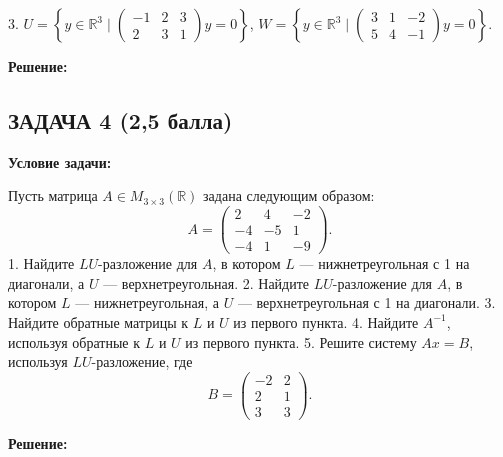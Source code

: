 \documentclass[a4paper,12pt]{article}
\begin{document}
3. \( U = \left\{ y \in \mathbb{R}^3 \mid
\begin{pmatrix}
-1 & 2 & 3 \\
2 & 3 & 1
\end{pmatrix}
y = 0
\right\} \),
\( W = \left\{ y \in \mathbb{R}^3 \mid
\begin{pmatrix}
3 & 1 & -2 \\
5 & 4 & -1
\end{pmatrix}
y = 0
\right\} \).

\textbf{Решение:}


\vspace{1cm}

\subsection{ЗАДАЧА 4 \hfill \textbf{(2,5 балла)}}
\textbf{Условие задачи:}

Пусть матрица \( A \in M_{3 \times 3}(\mathbb{R}) \) задана следующим образом:
\[
A =
\begin{pmatrix}
2 & 4 & -2 \\
-4 & -5 & 1 \\
-4 & 1 & -9
\end{pmatrix}.
\]
1. Найдите \( LU \)-разложение для \( A \), в котором \( L \) — нижнетреугольная с 1 на диагонали, а \( U \) — верхнетреугольная.
2. Найдите \( LU \)-разложение для \( A \), в котором \( L \) — нижнетреугольная, а \( U \) — верхнетреугольная с 1 на диагонали.
3. Найдите обратные матрицы к \( L \) и \( U \) из первого пункта.
4. Найдите \( A^{-1} \), используя обратные к \( L \) и \( U \) из первого пункта.
5. Решите систему \( Ax = B \), используя \( LU \)-разложение, где
\[
B =
\begin{pmatrix}
-2 & 2 \\
2 & 1 \\
3 & 3
\end{pmatrix}.
\]

\textbf{Решение:}
\end{document}
